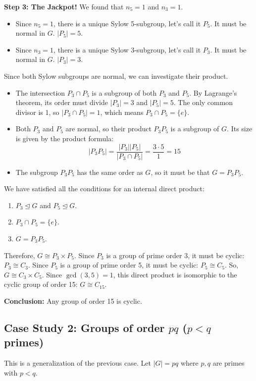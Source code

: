 \documentclass[12pt,a4paper]{article}
\theoremstyle{plain} %
\theoremstyle{definition} %
\theoremstyle{remark} %
\begin{document}
\textbf{Step 3: The Jackpot!}
We found that $n_5=1$ and $n_3=1$.
\begin{itemize}
    \item Since $n_5=1$, there is a unique Sylow 5-subgroup, let's call it $P_5$. It must be normal in $G$. $|P_5|=5$.
    \item Since $n_3=1$, there is a unique Sylow 3-subgroup, let's call it $P_3$. It must be normal in $G$. $|P_3|=3$.
\end{itemize}
Since both Sylow subgroups are normal, we can investigate their product.
\begin{itemize}
    \item The intersection $P_3 \cap P_5$ is a subgroup of both $P_3$ and $P_5$. By Lagrange's theorem, its order must divide $|P_3|=3$ and $|P_5|=5$. The only common divisor is 1, so $|P_3 \cap P_5|=1$, which means $P_3 \cap P_5 = \{e\}$.
    \item Both $P_3$ and $P_5$ are normal, so their product $P_3P_5$ is a subgroup of $G$. Its size is given by the product formula:
    \[
    |P_3P_5| = \frac{|P_3||P_5|}{|P_3 \cap P_5|} = \frac{3 \cdot 5}{1} = 15
    \]
    \item The subgroup $P_3P_5$ has the same order as $G$, so it must be that $G = P_3P_5$.
\end{itemize}
We have satisfied all the conditions for an internal direct product:
\begin{enumerate}
    \item $P_3 \unlhd G$ and $P_5 \unlhd G$.
    \item $P_3 \cap P_5 = \{e\}$.
    \item $G = P_3P_5$.
\end{enumerate}
Therefore, $G \cong P_3 \times P_5$.
Since $P_3$ is a group of prime order 3, it must be cyclic: $P_3 \cong C_3$.
Since $P_5$ is a group of prime order 5, it must be cyclic: $P_5 \cong C_5$.
So, $G \cong C_3 \times C_5$. Since $\gcd(3,5)=1$, this direct product is isomorphic to the cyclic group of order 15: $G \cong C_{15}$.

\textbf{Conclusion:} Any group of order 15 is cyclic.

\subsection{Case Study 2: Groups of order $pq$ ($p<q$ primes)}
This is a generalization of the previous case. Let $|G|=pq$ where $p, q$ are primes with $p<q$.
\end{document}
